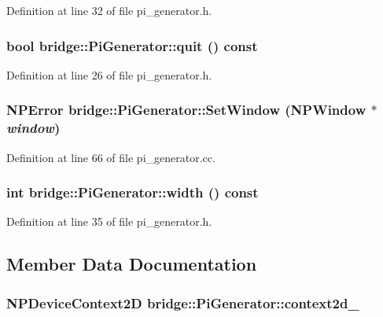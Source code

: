 Definition at line 32 of file pi\_\-generator.h.

\hypertarget{classbridge_1_1_pi_generator_a756bd50f86283c0970abbb1ce0d0a322}{
\subsubsection[{quit}]{\setlength{\rightskip}{0pt plus 5cm}bool bridge::PiGenerator::quit () const}}
\label{classbridge_1_1_pi_generator_a756bd50f86283c0970abbb1ce0d0a322}


Definition at line 26 of file pi\_\-generator.h.

\hypertarget{classbridge_1_1_pi_generator_ab0043ce08d314d9e1ffbd6f0a7b85d66}{
\subsubsection[{SetWindow}]{\setlength{\rightskip}{0pt plus 5cm}NPError bridge::PiGenerator::SetWindow (NPWindow $\ast$ {\em window})}}
\label{classbridge_1_1_pi_generator_ab0043ce08d314d9e1ffbd6f0a7b85d66}


Definition at line 66 of file pi\_\-generator.cc.

\hypertarget{classbridge_1_1_pi_generator_ab96bd1df955862228ca1c2a42344debc}{
\subsubsection[{width}]{\setlength{\rightskip}{0pt plus 5cm}int bridge::PiGenerator::width () const}}
\label{classbridge_1_1_pi_generator_ab96bd1df955862228ca1c2a42344debc}


Definition at line 35 of file pi\_\-generator.h.



\subsection{Member Data Documentation}
\hypertarget{classbridge_1_1_pi_generator_a8c9e304f8243c23dae9e10186c550572}{
\subsubsection[{context2d\_\-}]{\setlength{\rightskip}{0pt plus 5cm}NPDeviceContext2D {\bf bridge::PiGenerator::context2d\_\-}}}
\label{classbridge_1_1_pi_generator_a8c9e304f8243c23dae9e10186c550572}



